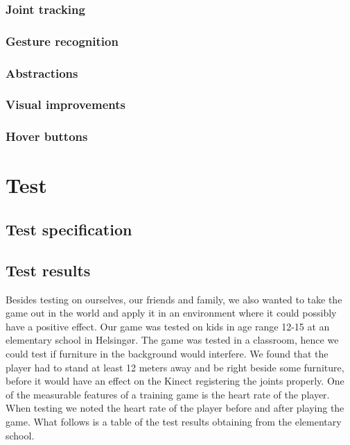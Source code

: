 \documentclass[11pt]{report}
\begin{document}
\subsection{Joint tracking}

\subsection{Gesture recognition}

\subsection{Abstractions}

\subsection{Visual improvements}

\subsection{Hover buttons}

\chapter{Test}
\section{Test specification}


\section{Test results}
Besides testing on ourselves, our friends and family, we also wanted to take the game out in the world and apply it in an environment where it could possibly have a positive effect. Our game was tested on kids in age range 12-15 at an elementary school in Helsing\o r. The game was tested in a classroom, hence we could test if furniture in the background would interfere. We found that the player had to stand at least 12 meters away and be right beside some furniture, before it would have an effect on the Kinect registering the joints properly. One of the measurable features of a training game is the heart rate of the player. When testing we noted the heart rate of the player before and after playing the game. What follows is a table of the test results obtaining from the elementary school.
\end{document}
